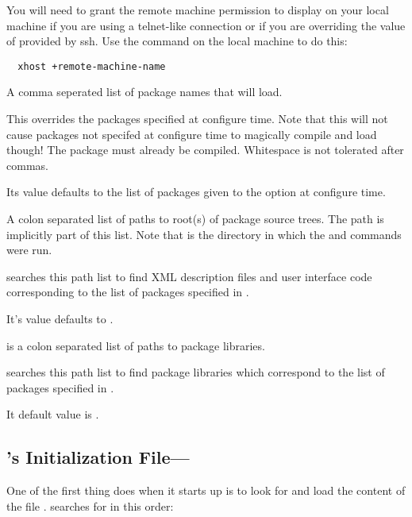 \begin{description}
  You will need to grant the remote machine permission to display on
  your local machine if you are using a telnet-like connection or if
  you are overriding the value of  provided by ssh.
  Use the  command on the local machine to do
  this:

\begin{verbatim}
  xhost +remote-machine-name
\end{verbatim}
  
   A comma seperated list of package names that
  \sr{} will load.
  
  This overrides the packages specified at configure time.  Note
  that this will not cause packages not specifed at configure time
  to magically compile and load though!  The package must already be
  compiled.  Whitespace is not tolerated after commas.
  
  Its value defaults to the list of packages given to the
   option at configure time.
  
   A colon separated list of paths to
  root(s) of package source trees.  The path
   is implicitly part of this
  list.  Note that  is the directory in which the
   and  commands were run.
  
  \sr{} searches this path list to find XML description files and
  user interface code corresponding to the list of packages
  specified in .
  
  It's value defaults to .
  
    is a colon
  separated list of paths to package libraries.
  
  \sr{} searches this path list to find package libraries
  which correspond to the list of packages specified in
  .
  
  It default value is .

  
\end{description}

\subsection{\sr{}'s Initialization File---}
\label{sec:scirunrc}

One of the first thing \sr{} does when it starts up is to look for and
load the content of the file .  \sr{} searches for
 in this order:

